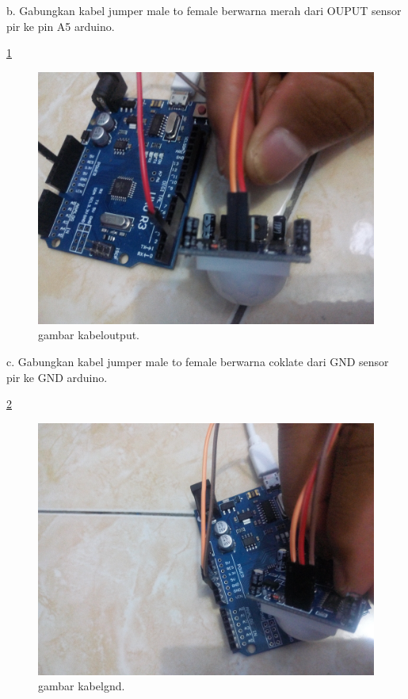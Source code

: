 b. Gabungkan kabel jumper male to female berwarna merah dari OUPUT sensor pir ke pin A5 arduino.

\ref{kabeloutput}

\begin{figure} [ht]
\centerline{\includegraphics[width=1\textwidth]{figures/kabeloutput.JPG}}
\caption{gambar kabeloutput.}
\label{kabeloutput}
\end{figure}

c. Gabungkan kabel jumper male to female berwarna coklate dari GND sensor pir ke GND arduino.

\ref{kabelgnd}

\begin{figure} [ht]
\centerline{\includegraphics[width=1\textwidth]{figures/kabelgnd.JPG}}
\caption{gambar kabelgnd.}
\label{kabelgnd}
\end{figure}

